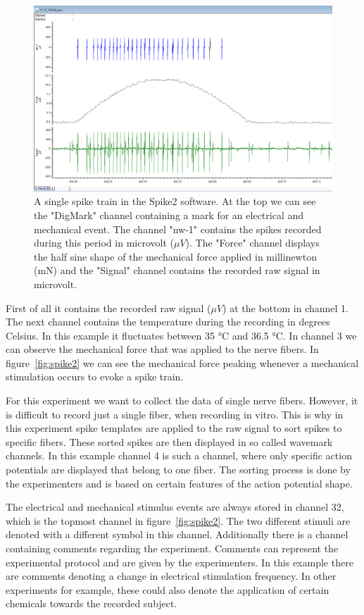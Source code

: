 \begin{figure}
	\includegraphics[width = \textwidth]{src/pic/Spike2_spike_train}
	\caption{A single spike train in the Spike2 software. At the top we can see the "DigMark" channel containing a mark for an electrical and mechanical event. The channel "nw-1" contains the spikes recorded during this period in microvolt ($\mu V$). The "Force" channel displays the half sine shape of the mechanical force applied in millinewton (mN) and the "Signal" channel contains the recorded raw signal in microvolt.}
	\label{fig:spike_train}
\end{figure}
First of all it contains the recorded raw signal ($\mu V$) at the bottom in channel 1. The next channel contains the temperature during the recording in degrees Celsius. In this example it fluctuates between 35 °C and 36.5 °C. In channel 3 we can observe the mechanical force that was applied to the nerve fibers. In figure~\ref{fig:spike2} we can see the mechanical force peaking whenever a mechanical stimulation occurs to evoke a spike train. 

For this experiment we want to collect the data of single nerve fibers. However, it is difficult to record just a single fiber, when recording in vitro. This is why in this experiment spike templates are applied to the raw signal to sort spikes to specific fibers. These sorted spikes are then displayed in so called wavemark channels. In this example channel 4 is such a channel, where only specific action potentials are displayed that belong to one fiber. The sorting process is done by the experimenters and is based on certain features of the action potential shape.

The electrical and mechanical stimulus events are always stored in channel 32, which is the topmost channel in figure~\ref{fig:spike2}. The two different stimuli are denoted with a different symbol in this channel. Additionally there is a channel containing comments regarding the experiment. Comments can represent the experimental protocol and are given by the experimenters. In this example there are comments denoting a change in electrical stimulation frequency. In other experiments for example, these could also denote the application of certain chemicals towards the recorded subject.

